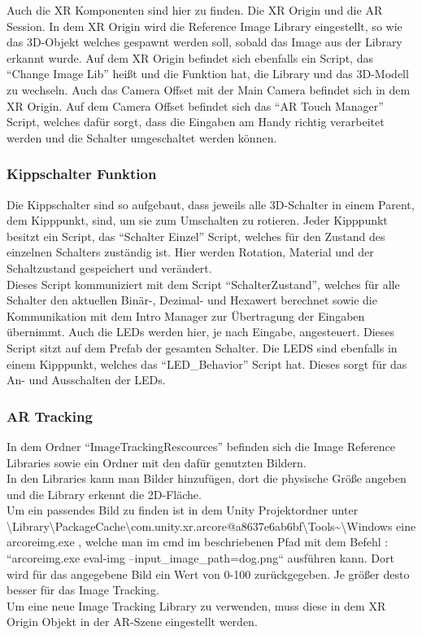 Auch die XR Komponenten sind hier zu finden. Die XR Origin und die AR Session. In dem XR Origin wird die Reference Image Library eingestellt, so wie das 3D-Objekt welches gespawnt werden soll, sobald das Image aus der Library erkannt wurde. Auf dem XR Origin befindet sich ebenfalls ein Script, das “Change Image Lib” heißt und die Funktion hat, die Library und das 3D-Modell zu wechseln. Auch das Camera Offset mit der Main Camera befindet sich in dem XR Origin. Auf dem Camera Offset befindet sich das “AR Touch Manager” Script, welches dafür sorgt, dass die Eingaben am Handy richtig verarbeitet werden und die Schalter umgeschaltet werden können. 

\subsubsection*{Kippschalter Funktion}
Die Kippschalter sind so aufgebaut, dass jeweils alle 3D-Schalter in einem Parent, dem Kipppunkt, sind, um sie zum Umschalten zu rotieren. Jeder Kipppunkt besitzt ein Script, das “Schalter Einzel” Script, welches für den Zustand des einzelnen Schalters zuständig ist. Hier werden Rotation, Material und der Schaltzustand gespeichert und verändert.\\

Dieses Script kommuniziert mit dem Script “SchalterZustand”, welches für alle Schalter den aktuellen Binär-, Dezimal- und Hexawert berechnet sowie die Kommunikation mit dem Intro Manager zur Übertragung der Eingaben übernimmt. Auch die LEDs werden hier, je nach Eingabe, angesteuert. Dieses Script sitzt auf dem Prefab der gesamten Schalter. Die LEDS sind ebenfalls in einem Kipppunkt, welches das “LED\_Behavior” Script hat. Dieses sorgt für das An- und Ausschalten der LEDs.

\subsubsection*{AR Tracking}
In dem Ordner “ImageTrackingRescources” befinden sich die Image Reference Libraries sowie ein Ordner mit den dafür genutzten Bildern.\\
In den Libraries kann man Bilder hinzufügen, dort die physische Größe angeben und die Library erkennt die 2D-Fläche.\\
Um ein passendes Bild zu finden ist in dem Unity Projektordner unter \\\textbackslash Library\textbackslash PackageCache\textbackslash com.unity.xr.arcore@a8637e6ab6bf\textbackslash Tools\textasciitilde\textbackslash Windows eine arcoreimg.exe , welche man im cmd im beschriebenen Pfad mit dem Befehl : \\“arcoreimg.exe eval-img --input\_image\_path=dog.png“ ausführen kann. Dort wird für das angegebene Bild ein Wert von 0-100 zurückgegeben. Je größer desto besser für das Image Tracking.\\
Um eine neue Image Tracking Library zu verwenden, muss diese in dem XR Origin Objekt in der AR-Szene eingestellt werden.

